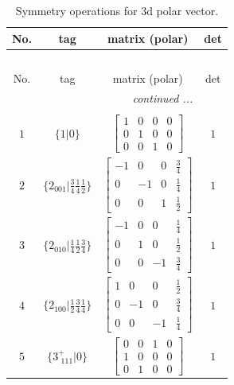 \documentclass[fleqn,8pt]{jsarticle}
\begin{document}
\begin{longtable}{cccc}
\caption{Symmetry operations for 3d polar vector.}
 \\
 \hline \hline
No. & tag & matrix (polar) & det \\ \hline \endfirsthead

\multicolumn{3}{l}{\tablename\ \thetable{}} \\
 \hline \hline
No. & tag & matrix (polar) & det \\ \hline \endhead

 \hline \hline
\multicolumn{3}{r}{\footnotesize\it continued ...} \\ \endfoot

 \hline \hline
\multicolumn{3}{r}{} \\ \endlastfoot

$ 1 $ & $ \{1|0\} $ & $ \begin{bmatrix} 1 & 0 & 0 & 0 \\ 0 & 1 & 0 & 0 \\ 0 & 0 & 1 & 0 \end{bmatrix} $ & $ 1 $ \\ \hline
$ 2 $ & $ \{2{}_{001}|\frac{3}{4} \frac{1}{4} \frac{1}{2}\} $ & $ \begin{bmatrix} -1 & 0 & 0 & \frac{3}{4} \\ 0 & -1 & 0 & \frac{1}{4} \\ 0 & 0 & 1 & \frac{1}{2} \end{bmatrix} $ & $ 1 $ \\ \hline
$ 3 $ & $ \{2{}_{010}|\frac{1}{4} \frac{1}{2} \frac{3}{4}\} $ & $ \begin{bmatrix} -1 & 0 & 0 & \frac{1}{4} \\ 0 & 1 & 0 & \frac{1}{2} \\ 0 & 0 & -1 & \frac{3}{4} \end{bmatrix} $ & $ 1 $ \\ \hline
$ 4 $ & $ \{2{}_{100}|\frac{1}{2} \frac{3}{4} \frac{1}{4}\} $ & $ \begin{bmatrix} 1 & 0 & 0 & \frac{1}{2} \\ 0 & -1 & 0 & \frac{3}{4} \\ 0 & 0 & -1 & \frac{1}{4} \end{bmatrix} $ & $ 1 $ \\ \hline
$ 5 $ & $ \{3^{+}_{\,\,111}|0\} $ & $ \begin{bmatrix} 0 & 0 & 1 & 0 \\ 1 & 0 & 0 & 0 \\ 0 & 1 & 0 & 0 \end{bmatrix} $ & $ 1 $ \\ \hline

\end{longtable}
\end{document}
